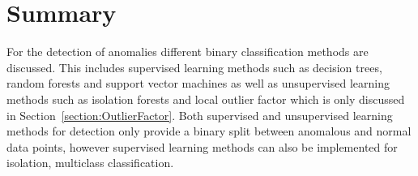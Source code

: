 \section{Summary}
For the detection of anomalies different binary classification methods are discussed. This includes supervised learning methods such as decision trees, random forests and support vector machines as well as unsupervised learning methods such as isolation forests and local outlier factor which is only discussed in Section~\ref{section:OutlierFactor}. Both supervised and unsupervised learning methods for detection only provide a binary split between anomalous and normal data points, however supervised learning methods can also be implemented for isolation, multiclass classification.